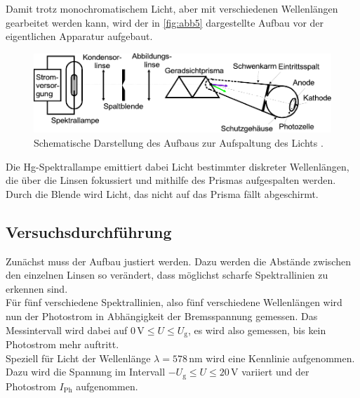 Damit trotz monochromatischem Licht, aber mit verschiedenen Wellenlängen gearbeitet werden kann, wird der in \autoref{fig:abb5} dargestellte Aufbau vor der eigentlichen Apparatur aufgebaut.

\begin{figure}[H]
    \centering
    \includegraphics{figures/Abb5.pdf}
    \caption{Schematische Darstellung des Aufbaus zur Aufspaltung des Lichts \cite{ap10}.}
    \label{fig:abb5}
\end{figure}

Die Hg-Spektrallampe emittiert dabei Licht bestimmter diskreter Wellenlängen, die über die Linsen fokussiert und mithilfe des Prismas aufgespalten werden.
Durch die Blende wird Licht, das nicht auf das Prisma fällt abgeschirmt.

\subsection{Versuchsdurchführung}

Zunächst muss der Aufbau justiert werden.
Dazu werden die Abstände zwischen den einzelnen Linsen so verändert, dass möglichst scharfe Spektrallinien zu erkennen sind. \\

Für fünf verschiedene Spektrallinien, also fünf verschiedene Wellenlängen wird nun der Photostrom in Abhängigkeit der Bremsspannung gemessen.
Das Messintervall wird dabei auf $0 \,\unit{\volt} \leq U \leq U_\text{g}$, es wird also gemessen, bis kein Photostrom mehr auftritt. \\

Speziell für Licht der Wellenlänge $\lambda = 578 \, \unit{\nano\meter}$ wird eine Kennlinie aufgenommen.
Dazu wird die Spannung im Intervall $-U_\text{g} \leq U \leq 20 \,\unit{\volt}$ variiert und der Photostrom $I_\text{Ph}$ aufgenommen.

